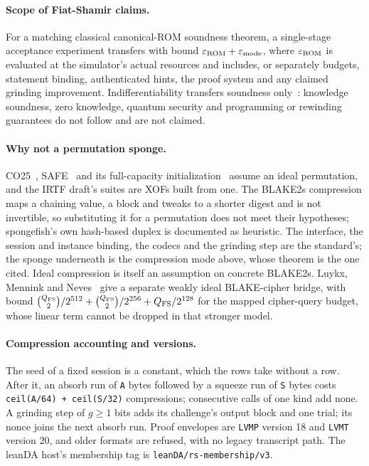 \paragraph{Scope of Fiat-Shamir claims.} For a matching classical canonical-ROM soundness theorem, a single-stage acceptance experiment transfers with bound $\varepsilon_{\mathrm{ROM}}+\varepsilon_{\mathrm{mode}}$, where $\varepsilon_{\mathrm{ROM}}$ is evaluated at the simulator's actual resources and includes, or separately budgets, statement binding, authenticated hints, the proof system and any claimed grinding improvement. Indifferentiability transfers soundness only~\cite[\S2.3]{CO25}: knowledge soundness, zero knowledge, quantum security and programming or rewinding guarantees do not follow and are not claimed.

\paragraph{Why not a permutation sponge.} CO25~\cite{CO25}, SAFE~\cite{SAFE23} and its full-capacity initialization~\cite[Theorem 2]{KMM23} assume an ideal permutation, and the IRTF draft's suites are XOFs built from one. The BLAKE2s compression maps a chaining value, a block and tweaks to a shorter digest and is not invertible, so substituting it for a permutation does not meet their hypotheses; spongefish's own hash-based duplex is documented as heuristic. The interface, the session and instance binding, the codecs and the grinding step are the standard's; the sponge underneath is the compression mode above, whose theorem is the one cited. Ideal compression is itself an assumption on concrete BLAKE2s. Luykx, Mennink and Neves~\cite[Theorem 1]{LMN16} give a separate weakly ideal BLAKE-cipher bridge, with bound $\binom{Q_{\mathrm{FS}}}{2}/2^{512}+\binom{Q_{\mathrm{FS}}}{2}/2^{256}+Q_{\mathrm{FS}}/2^{128}$ for the mapped cipher-query budget, whose linear term cannot be dropped in that stronger model.

\paragraph{Compression accounting and versions.} The seed of a fixed session is a constant, which the rows take without a row. After it, an absorb run of \texttt{A} bytes followed by a squeeze run of \texttt{S} bytes costs \texttt{ceil(A/64) + ceil(S/32)} compressions; consecutive calls of one kind add none. A grinding step of $g\ge1$ bits adds its challenge's output block and one trial; its nonce joins the next absorb run. Proof envelopes are \texttt{LVMP} version 18 and \texttt{LVMT} version 20, and older formats are refused, with no legacy transcript path. The leanDA host's membership tag is \texttt{leanDA/rs-membership/v3}.


